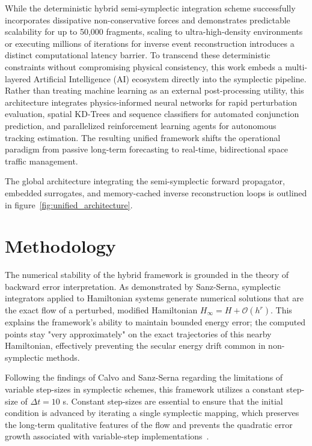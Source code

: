 \documentclass[letterpaper, preprint, 11pt]{AAS}
\begin{document}
While the deterministic hybrid semi-symplectic integration scheme successfully incorporates dissipative non-conservative forces and demonstrates predictable scalability for up to 50,000 fragments, scaling to ultra-high-density environments or executing millions of iterations for inverse event reconstruction introduces a distinct computational latency barrier. To transcend these deterministic constraints without compromising physical consistency, this work embeds a multi-layered Artificial Intelligence (AI) ecosystem directly into the symplectic pipeline. Rather than treating machine learning as an external post-processing utility, this architecture integrates physics-informed neural networks for rapid perturbation evaluation, spatial KD-Trees and sequence classifiers for automated conjunction prediction, and parallelized reinforcement learning agents for autonomous tracking estimation. The resulting unified framework shifts the operational paradigm from passive long-term forecasting to real-time, bidirectional space traffic management.

The global architecture integrating the semi-symplectic forward propagator, embedded surrogates, and memory-cached inverse reconstruction loops is outlined in figure~\ref{fig:unified_architecture}.

\section{Methodology}

The numerical stability of the hybrid framework is grounded in the theory of backward error interpretation. As demonstrated by Sanz-Serna, symplectic integrators applied to Hamiltonian systems generate numerical solutions that are the exact flow of a perturbed, modified Hamiltonian $H_{\infty} = H + \mathcal{O}(h^r)$. This explains the framework's ability to maintain bounded energy error; the computed points stay "very approximately" on the exact trajectories of this nearby Hamiltonian, effectively preventing the secular energy drift common in non-symplectic methods.

Following the findings of Calvo and Sanz-Serna regarding the limitations of variable step-sizes in symplectic schemes, this framework utilizes a constant step-size of $\Delta t = 10$ s. Constant step-sizes are essential to ensure that the initial condition is advanced by iterating a single symplectic mapping, which preserves the long-term qualitative features of the flow and prevents the quadratic error growth associated with variable-step implementations~\cite{sanz-serna_symplectic_1992}.
\end{document}

